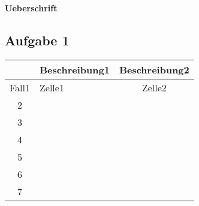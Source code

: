 \documentclass[a4paper,12pt]{article}
\begin{document}
\begin{center}
\Large
\textbf{Ueberschrift}
\end{center}
\subsection{Aufgabe 1}
\begin{tabular} [h] {||c|l|c||} 
\hline \rule[-1.5mm]{0pt}{5.5ex} & \normalsize Beschreibung1 & Beschreibung2 \\ 
\hline
\hline \rule[-1.5mm]{0pt}{5.5ex} Fall1 & Zelle1 & Zelle2 \\ 
\hline \rule[-1.5mm]{0pt}{5.5ex} 2 &  & \\ 
\hline \rule[-1.5mm]{0pt}{5.5ex} 3 &  & \\ 
\hline \rule[-1.5mm]{0pt}{5.5ex} 4 &  & \\ 
\hline \rule[-1.5mm]{0pt}{5.5ex} 5 &  & \\ 
\hline \rule[-1.5mm]{0pt}{5.5ex} 6 &  & \\ 
\hline \rule[-1.5mm]{0pt}{5.5ex} 7 &  & \\ 
\hline
\end{tabular}
\end{document}
